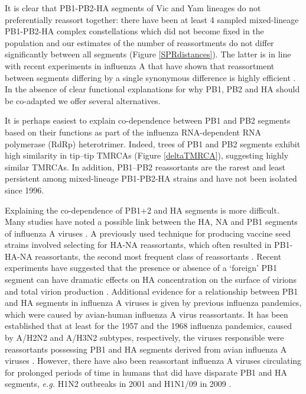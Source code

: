 \documentclass[11pt,oneside,letterpaper]{article}
\begin{document}
It is clear that PB1-PB2-HA segments of Vic and Yam lineages do not preferentially reassort together: there have been at least 4 sampled mixed-lineage PB1-PB2-HA complex constellations which did not become fixed in the population and our estimates of the number of reassortments do not differ significantly between all segments (Figure \ref{SPRdistances}).
The latter is in line with recent experiments in influenza A that have shown that reassortment between segments differing by a single synonymous difference is highly efficient \cite{marshall2013}.
In the absence of clear functional explanations for why PB1, PB2 and HA should be co-adapted we offer several alternatives.

It is perhaps easiest to explain co-dependence between PB1 and PB2 segments based on their functions as part of the influenza RNA-dependent RNA polymerase (RdRp) heterotrimer.
Indeed, trees of PB1 and PB2 segments exhibit high similarity in tip--tip TMRCAs (Figure \ref{deltaTMRCA}), suggesting highly similar TMRCAs.
In addition, PB1--PB2 reassortants are the rarest and least persistent among mixed-lineage PB1-PB2-HA strains and have not been isolated since 1996.

Explaining the co-dependence of PB1+2 and HA segments is more difficult.
Many studies have noted a possible link between the HA, NA and PB1 segments of influenza A viruses \cite{bergeron2010,fulvini2011}.
A previously used technique for producing vaccine seed strains involved selecting for HA-NA reassortants, which often resulted in PB1-HA-NA reassortants, the second most frequent class of reassortants \cite{bergeron2010,fulvini2011}.
Recent experiments have suggested that the presence or absence of a `foreign' PB1 segment can have dramatic effects on HA concentration on the surface of virions and total virion production \cite{cobbin2013}.
Additional evidence for a relationship between PB1 and HA segments in influenza A viruses is given by previous influenza pandemics, which were caused by avian-human influenza A virus reassortants.
It has been established that at least for the 1957 and the 1968 influenza pandemics, caused by A/H2N2 and A/H3N2 subtypes, respectively, the viruses responsible were reassortants possessing PB1 and HA segments derived from avian influenza A viruses \cite{kawaoka1989}.
However, there have also been reassortant influenza A viruses circulating for prolonged periods of time in humans that did have disparate PB1 and HA segments, \textit{e.g.} H1N2 outbreaks in 2001 \cite{gregory2002} and H1N1/09 in 2009 \cite{smith2009}.
\end{document}
